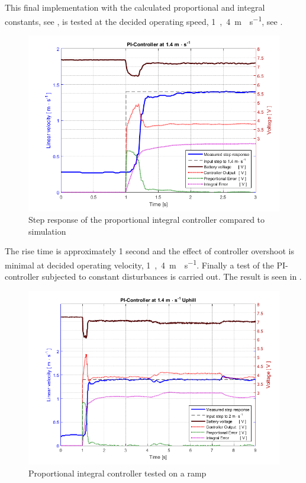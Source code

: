 This final implementation with the calculated proportional and integral constants, see , is tested at the decided operating speed, \si{1,4 m\cdot s^{-1}}, see .
%
\begin{figure}[H]
 	\centering
 	\includegraphics[width=.9\textwidth]{figures/PInew}
 	\caption{Step response of the proportional integral controller compared to simulation}
 	\label{fig:PInew}
\end{figure}\vspace{-5mm}
%
The rise time is approximately 1 second and the effect of controller overshoot is minimal at decided operating velocity, \si{1,4 m\cdot s^{-1}}. Finally a test of the PI-controller subjected to constant disturbances is carried out. The result is seen in .
%
\begin{figure}[H]
 	\centering
 	\includegraphics[width=.9\textwidth]{figures/PIhill}
 	\caption{Proportional integral controller tested on a ramp}
 	\label{fig:PIhill}
\end{figure}\vspace{-5mm}

